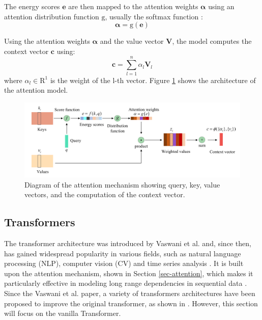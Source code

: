 The energy scores $\boldsymbol{e}$ are then mapped to the attention weights $\boldsymbol{\alpha}$ using an attention distribution function $\mathrm{g}$, usually the softmax function \cite{NIU202148}:
\begin{equation}
    \boldsymbol{\alpha} = \mathrm{g}(\boldsymbol{e})
\end{equation}

Using the attention weights $\boldsymbol{\alpha}$ and the value vector $\boldsymbol{V}$, the model computes the context vector $\boldsymbol{c}$ using:
\begin{equation}
    \boldsymbol{c} = \sum_{l=1}^{n} \alpha_l \boldsymbol{V}_l  
\end{equation}
where $\alpha_l \in \mathrm{R}^1$ is the weight of the l-th vector. Figure \ref{fig:Attention-struct} shows the architecture of the attention model.

\begin{figure}[H]
    \centering
    \includegraphics[width=12cm]{Cap2_LitReview/model_basics/Attention/attention-struct.png}
    \caption{Diagram of the attention mechanism showing query, key, value vectors, and the computation of the context vector. \cite{NIU202148}}
    \label{fig:Attention-struct}
\end{figure}

\subsection{Transformers}

The transformer architecture was introduced by Vaswani et al. \cite{vaswani2023attentionneed} and, since then, has gained widespread popularity in various fields, such as natural language processing (NLP), computer vision (CV) and time series analysis \cite{lin2021surveytransformers}. It is built upon the attention mechanism, shown in Section \ref{sec-attention}, which makes it particularly effective in modeling long range dependencies in sequential data \cite{wen2023transformerstimeseriessurvey}. Since the Vaswani et al. \cite{vaswani2023attentionneed} paper, a variety of transformers architectures have been proposed to improve the original transformer, as shown in \cite{lin2021surveytransformers}. However, this section will focus on the vanilla Transformer.

